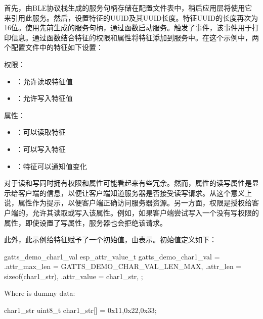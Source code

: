 \documentclass[lang=cn,newtx,10pt,scheme=chinese]{elegantbook}
\begin{document}
首先，由BLE协议栈生成的服务句柄存储在配置文件表中，稍后应用层将使用它来引用此服务。然后，设置特征的UUID及其UUID长度。特征UUID的长度再次为16位。使用先前生成的服务句柄，通过函数启动服务。触发了事件，该事件用于打印信息。通过函数结合特征的权限和属性将特征添加到服务中。在这个示例中，两个配置文件中的特征如下设置：

权限：

\begin{itemize}
\item {}：允许读取特征值
\item {}：允许写入特征值
\end{itemize}

属性：

\begin{itemize}
\item {}：可以读取特征
\item {}：可以写入特征
\item {}：特征可以通知值变化
\end{itemize}

对于读和写同时拥有权限和属性可能看起来有些冗余。然而，属性的读写属性是显示给客户端的信息，以便让客户端知道服务器是否接受读写请求。从这个意义上说，属性作为提示，以便客户端正确访问服务器资源。另一方面，权限是授权给客户端的，允许其读取或写入该属性。例如，如果客户端尝试写入一个没有写权限的属性，即使设置了写属性，服务器也会拒绝该请求。

此外，此示例给特征赋予了一个初始值，由表示。初始值定义如下：

\begin{mycode}{gatts\_demo\_char1\_val}
esp_attr_value_t gatts_demo_char1_val =
{
    .attr_max_len = GATTS_DEMO_CHAR_VAL_LEN_MAX,
    .attr_len     = sizeof(char1_str),
    .attr_value   = char1_str,
};
\end{mycode}

Where  is dummy data:

\begin{mycode}{char1\_str}
uint8_t char1_str[] = {0x11,0x22,0x33};
\end{mycode}
\end{document}
